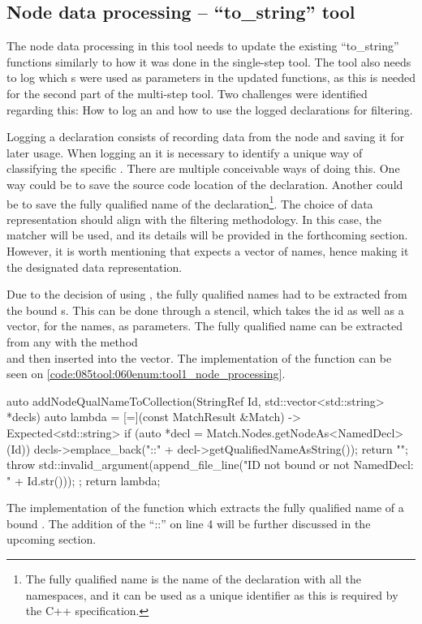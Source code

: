 \subsection{Node data processing -- ``to\_string'' tool}
The node data processing in this tool needs to update the existing ``to\_string'' functions similarly to how it was done in the single-step tool.
The tool also needs to log which s were used as parameters in the updated functions, as this is needed for the second part of the multi-step tool.
Two challenges were identified regarding this: How to log an  and how to use the logged declarations for filtering.

Logging a declaration consists of recording data from the node and saving it for later usage.
When logging an  it is necessary to identify a unique way of classifying the specific . There are multiple conceivable ways of doing this.
One way could be to save the source code location of the declaration. Another could be to save the fully qualified name of the declaration\footnote{The fully qualified name is the name of the declaration with all the namespaces, and it can be used as a unique identifier as this is required by the C++ specification.}.
The choice of data representation should align with the filtering methodology. In this case, the matcher  will be used, and its details will be provided in the forthcoming section.
However, it is worth mentioning that  expects a vector of names, hence making it the designated data representation.

Due to the decision of using , the fully qualified names had to be extracted from the bound s.
This can be done through a stencil, which takes the id as well as a vector, for the names, as parameters.
The fully qualified name can be extracted from any  with the method\\
 and then inserted into the vector. 
The implementation of the  function can be seen on \cref{code:085tool:060enum:tool1_node_processing}.

\begin{listing}[H]
  \begin{cppcode}
auto addNodeQualNameToCollection(StringRef Id, std::vector<std::string> *decls) {
	auto lambda = [=](const MatchResult &Match) -> Expected<std::string> {
		if (auto *decl = Match.Nodes.getNodeAs<NamedDecl>(Id)) {
			decls->emplace_back("::" + decl->getQualifiedNameAsString());
			return "";
		}
		throw std::invalid_argument(append_file_line("ID not bound or not NamedDecl: " + Id.str()));
	};
	return lambda;
}
  \end{cppcode}
  \caption{The implementation of the function which extracts the fully qualified name of a bound . The addition of the ``::'' on line 4 will be further discussed in the upcoming section.}
  \label{code:085tool:060enum:tool1_node_processing}
\end{listing}

